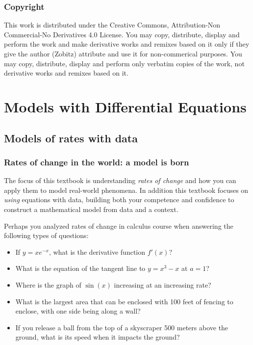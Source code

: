 \documentclass[
]{book}
\providecommand{\tightlist}{%
  \setlength{\itemsep}{0pt}\setlength{\parskip}{0pt}}
\theoremstyle{definition}
\theoremstyle{definition}
\theoremstyle{definition}
\theoremstyle{remark}
\begin{document}
\hypertarget{copyright}{%
\section*{Copyright}\label{copyright}}

This work is distributed under the Creative Commons, Attribution-Non Commercial-No Derivatives 4.0 License. You may copy, distribute, display and perform the work and make derivative works and remixes based on it only if they give the author (Zobitz) attribute and use it for non-commerical purposes. You may copy, distribute, display and perform only verbatim copies of the work, not derivative works and remixes based on it.

\hypertarget{part-models-with-differential-equations}{%
\part{Models with Differential Equations}\label{part-models-with-differential-equations}}

\hypertarget{intro-01}{%
\chapter{Models of rates with data}\label{intro-01}}

\hypertarget{rates-of-change-in-the-world-a-model-is-born}{%
\section{Rates of change in the world: a model is born}\label{rates-of-change-in-the-world-a-model-is-born}}

The focus of this textbook is understanding \emph{rates of change} and how you can apply them to model real-world phenomena. In addition this textbook focuses on \emph{using} equations with data, building both your competence and confidence to construct a mathematical model from data and a context.

Perhaps you analyzed rates of change in calculus course when answering the following types of questions:

\begin{itemize}
\tightlist
\item
  If \(y = xe^{-x}\), what is the derivative function \(f'(x)\)?
\item
  What is the equation of the tangent line to \(y=x^{3}-x\) at \(a=1\)?
\item
  Where is the graph of \(\sin(x)\) increasing at an increasing rate?
\item
  What is the largest area that can be enclosed with 100 feet of fencing to enclose, with one side being along a wall?
\item
  If you release a ball from the top of a skyscraper 500 meters above the ground, what is its speed when it impacts the ground?
\end{itemize}
\end{document}
